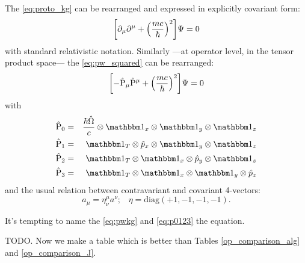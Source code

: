 The \eqref{eq:proto_kg} can be rearranged and expressed in explicitly covariant form:
\begin{equation}
  \qty[\partial_{\mu}\partial^{\mu} + \qty(\frac{mc}{\hbar})^2]\Psi = 0
\end{equation}
with standard relativistic notation.
Similarly
---at operator level, in the tensor product space---
the \eqref{eq:pw_squared} can be rearranged:
\begin{equation}\label{eq:pwkg}
  \qty[- \hat{\mathrm{P}}_{\mu} \hat{\mathrm{P}}^{\mu} + \qty(\frac{mc}{\hbar})^2]\Psi = 0
\end{equation}
with
\begin{equation}
\begin{aligned}\label{eq:p0123}
  \hat{\mathrm{P}}_0 &=& \frac{\hbar\hat{\Omega}}{c}  \ox \idop_x   \ox \idop_y   \ox \idop_z \\
  \hat{\mathrm{P}}_1 &=& \idop_T                      \ox \hat{p}_x \ox \idop_y   \ox \idop_z \\
  \hat{\mathrm{P}}_2 &=& \idop_T                      \ox \idop_x   \ox \hat{p}_y \ox \idop_z \\
  \hat{\mathrm{P}}_3 &=& \idop_T                      \ox \idop_x   \ox \idop_y   \ox \hat{p}_z
\end{aligned}
\end{equation}
and the usual relation between contravariant and covariant 4-vectors:
\begin{equation}
  a_\mu = \eta_{\nu}^{\mu} a^{\nu} \text{;} \quad
  \eta = \mathrm{diag}(+1, -1, -1, -1)
  \text{.}
\end{equation}

It's tempting to name the \eqref{eq:pwkg} and \eqref{eq:p0123} the  equation.

\iftodo
TODO. Now we make a table which is better than Tables \ref{op_comparison_alg} and \ref{op_comparison_J}.
\fi